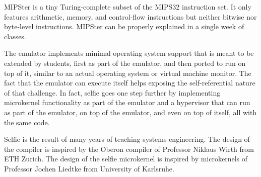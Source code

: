 MIPSter is a tiny Turing-complete subset of the MIPS32 instruction set. It only features arithmetic, memory, and control-flow instructions but neither bitwise nor byte-level instructions. MIPSter can be properly explained in a single week of classes.

The emulator implements minimal operating system support that is meant to be extended by students, first as part of the emulator, and then ported to run on top of it, similar to an actual operating system or virtual machine monitor. The fact that the emulator can execute itself helps exposing the self-referential nature of that challenge. In fact, selfie goes one step further by implementing microkernel functionality as part of the emulator and a hypervisor that can run as part of the emulator, on top of the emulator, and even on top of itself, all with the same code.

Selfie is the result of many years of teaching systems engineering. The design of the compiler is inspired by the Oberon compiler of Professor Niklaus Wirth from ETH Zurich. The design of the selfie microkernel is inspired by microkernels of Professor Jochen Liedtke from University of Karlsruhe.